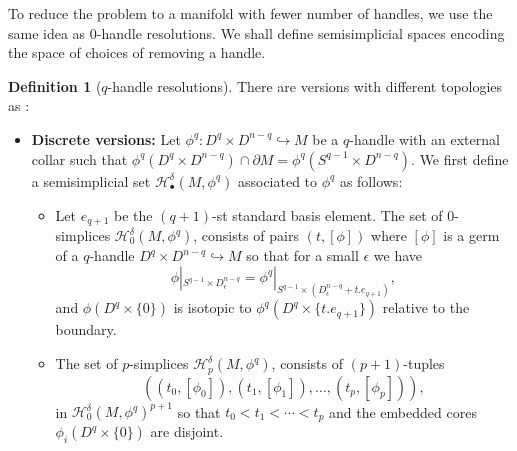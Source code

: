 \documentclass[a4paper]{amsart}
\theoremstyle{definition}
\newtheorem{defn}[thm]{Definition}
\theoremstyle{remark}
\numberwithin{equation}{section}
\begin{document}
To reduce the problem to a manifold with fewer number of handles, we use the same idea as $0$-handle resolutions. We  shall define  semisimplicial spaces encoding the space of choices of removing a handle. 
\begin{defn}[$q$-handle resolutions]\label{def2}
There are versions with different topologies as :
\begin{itemize}[leftmargin=*]\item {\bf Discrete versions:} Let $\phi^q: D^q\times D^{n-q}\hookrightarrow M$ be a $q$-handle with an external collar such that $\phi^q(D^q\times D^{n-q})\cap \partial M=\phi^q(S^{q-1}\times D^{n-q})$. We first define a semisimplicial set  $\mathcal{H}^{\delta}_{\bullet}(M,\phi^q)$ associated to $\phi^q$ as follows:
\begin{itemize}
\item Let $e_{q+1}$ be the $(q+1)$-st standard basis element. The set of $0$-simplices $\mathcal{H}^{\delta}_{0}(M,\phi^q)$, consists of pairs $(t,[\phi])$ where $[\phi]$ is a germ of a $q$-handle $D^q\times D^{n-q}\hookrightarrow M$ so that for a small $\epsilon$ we have 
\begin{equation}\label{eq15}
\phi|_{S^{q-1}\times D^{n-q}_{\epsilon}}=\phi^q|_{S^{q-1}\times(D^{n-q}_{\epsilon} +  t. e_{q+1})},
\end{equation}
and $\phi(D^q\times \{0\})$ is isotopic to $\phi^q(D^q\times \{t.e_{q+1}\})$ relative to the boundary. %
\item The set of  $p$-simplices   $\mathcal{H}^{\delta}_{p}(M,\phi^q)$, consists of $(p+1)$-tuples $$((t_0,[\phi_0]), (t_1,[\phi_1]),\dots, (t_p, [\phi_p])),$$ in $\mathcal{H}^{\delta}_{0}(M,\phi^q)^{p+1}$ so that $t_0<t_1<\cdots<t_p$ and  the embedded cores  $\phi_i(D^q\times \{0\})$ are disjoint.

\end{itemize}
\end{itemize}
\end{defn}
\end{document}
